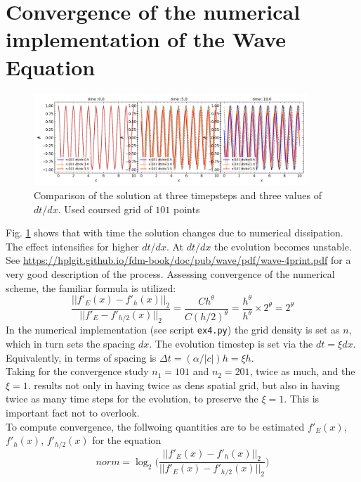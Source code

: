 \documentclass{article}
\begin{document}
\section{Convergence of the numerical implementation of the Wave Equation}
%
\begin{figure}[t]
	\label{fig:wave_profiles}
	\centering 
	\includegraphics[width=0.92\textwidth]{./fig4/profiles.png}
	\caption{Comparison of the solution at three timepsteps and three values of $dt/dx$. Used coursed grid of $101$ points}
\end{figure}
%
Fig. \ref{fig:wave_profiles} shows that with time the solution changes due to numerical dissipation. The effect intensifies for higher $dt/dx$. At $dt/dx$ the evolution becomes unstable.
%
See \url{https://hplgit.github.io/fdm-book/doc/pub/wave/pdf/wave-4print.pdf} for a very good description of the process. 
Assessing convergence of the numerical scheme, the familiar formula is utilized:
\begin{equation}
\frac{||f' _E(x) - f' _h(x)||_2}{||f' _E - f' _{h/2}(x)||_2} = \frac{Ch^{\theta}}{C(h/2)^{\theta}} = \frac{h^{\theta}}{h^{\theta}}\times 2^{\theta} = 2^{\theta}
\end{equation}
In the numerical implementation (see script \texttt{ex4.py}) the grid density is set as $n$, which in turn sets the spacing $dx$. The evolution timestep is set via the $dt = \xi dx$. Equivalently, in terms of spacing is $\Delta t = (\alpha / |c|) h = \xi h$. \\
Taking for the convergence study $n_1 = 101$ and $n_2 = 201$, twice as much, and the $\xi=1.$ results not only in having twice as dens spatial grid, but also in having twice as many time steps for the evolution, to preserve the $\xi=1.$ This is important fact not to overlook. \\
To compute convergence, the follwoing quantities are to be estimated $f'_{E}(x)$, $f'_{h}(x)$, $f'_{h/2}(x)$ for the equation 
\begin{equation}
norm = \log_2\Bigg( \frac{||f' _{E}(x) - f' _h(x)||_2}{||f' _E(x) - f' _{h/2}(x)||_2}\Bigg)
\end{equation}
\end{document}
